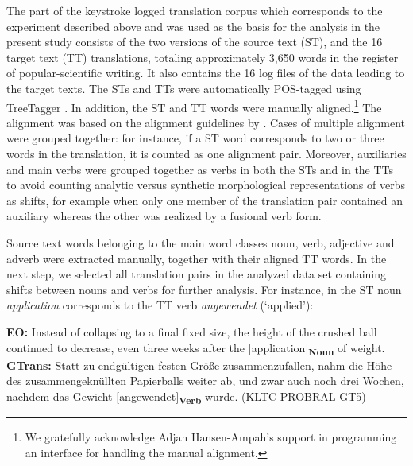 \documentclass[output=paper]{LSP/langsci}
\begin{document}
The part of the keystroke logged translation corpus which corresponds to the experiment described above and was used as the basis for the analysis in the present study consists of the two versions of the source text (ST), and the 16 target text (TT) translations, totaling approximately 3,650 words in the register of popular-scientific writing. It also contains the 16 log files of the  data leading to the target texts. The STs and TTs were automatically POS-tagged using TreeTagger \citep{Schmid1994}. In addition, the ST and TT words were manually aligned.\footnote{We gratefully acknowledge Adjan Hansen-Ampah's support in programming an interface for handling the manual alignment.} The alignment was based on the alignment guidelines by \citet{Samuelsson2010}. Cases of multiple alignment were grouped together: for instance, if a ST word corresponds to two or three words in the translation, it is counted as one alignment pair. Moreover, auxiliaries and main verbs were grouped together as verbs in both the STs and in the TTs to avoid counting analytic versus synthetic morphological representations of verbs as shifts, for example when only one member of the translation pair contained an auxiliary whereas the other was realized by a fusional verb form.

Source text words belonging to the main word classes noun, verb, adjective and adverb were extracted manually, together with their aligned TT words. In the next step, we selected all translation pairs in the analyzed data set containing shifts between nouns and verbs for further analysis. For instance, in  the ST noun \textit{application} corresponds to the TT verb \textit{angewendet} (`applied'): 

\ea\label{serbinaetal:ex:4}
\textbf{EO:} Instead of collapsing to a final fixed size, the height of the crushed ball continued to decrease, even three weeks after the $[$application$]$\textsubscript{\textbf{Noun}} of weight. \\
\textbf{GTrans:} Statt zu endgültigen festen Größe zusammenzufallen, nahm die Höhe des zusammengeknüllten Papierballs weiter ab, und zwar auch noch drei Wochen, nachdem das Gewicht $[$angewendet$]$\textsubscript{\textbf{Verb}} wurde. (KLTC PROBRAL GT5)
\z
\end{document}
